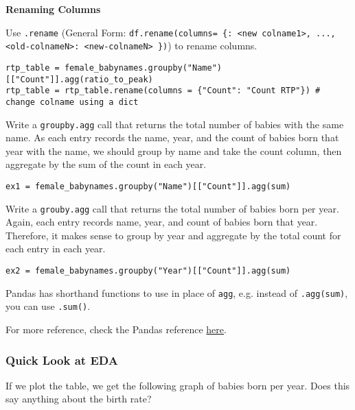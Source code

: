 \textbf{Renaming Columns}

Use \texttt{.rename} (General Form: \texttt{df.rename(columns= \{<old colname1>: <new colname1>, ..., <old-colnameN>: <new-colnameN> \})}) to rename columns.
\begin{verbatim}
rtp_table = female_babynames.groupby("Name")[["Count"]].agg(ratio_to_peak)
rtp_table = rtp_table.rename(columns = {"Count": "Count RTP"}) # change colname using a dict
\end{verbatim}

\begin{example}[]{Write a \texttt{groupby.agg} call that returns the total number of babies with the same name.
\tcbline 
As each entry records the name, year, and the count of babies born that year with the name, we should group by name and take the count column, then aggregate by the sum of the count in each year.
\begin{verbatim}
ex1 = female_babynames.groupby("Name")[["Count"]].agg(sum)
\end{verbatim}
}
\end{example}

\begin{example}[]{Write a \texttt{grouby.agg} call that returns the total number of babies born per year.
\tcbline 
Again, each entry records name, year, and count of babies born that year. Therefore, it makes sense to group by year and aggregate by the total count for each entry in each year.
\begin{verbatim}
ex2 = female_babynames.groupby("Year")[["Count"]].agg(sum)
\end{verbatim}
}
\end{example}

\begin{notebox}
Pandas has shorthand functions to use in place of \texttt{agg}, e.g. instead of \texttt{.agg(sum)}, you can use \texttt{.sum()}.

For more reference, check the Pandas reference \href{https://pandas.pydata.org/docs/reference/api/pandas.core.groupby.GroupBy.sum.html}{\color{blue}here}.
\end{notebox}

\subsubsection{Quick Look at EDA}
If we plot the table, we get the following graph of babies born per year. Does this say anything about the birth rate?

